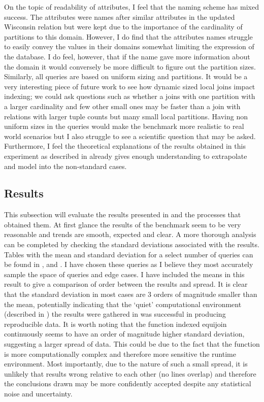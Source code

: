 On the topic of readability of attributes, I feel that the naming scheme has
mixed success. The attributes were names after similar attributes in the updated
Wisconsin relation but were kept due to the importance of the cardinality of
partitions to this domain. However, I do find that the attributes names struggle
to easily convey the values in their domains somewhat limiting the expression of
the database. I do feel, however, that if the name gave more information about
the domain it would conversely be more difficult to figure out the partition
sizes. Similarly, all queries are based on uniform sizing and partitions. It
would be a very interesting piece of future work to see how dynamic sized local
joins impact indexing; we could ask questions such as whether a joins with one
partition with a larger cardinality and few other small ones may be faster than
a join with relations with larger tuple counts but many small local partitions.
Having non uniform sizes in the queries would make the benchmark more realistic
to real world scenarios but I also struggle to see a scientific question that
may be asked. Furthermore, I feel the theoretical explanations of the results
obtained in this experiment as described in 
already gives enough understanding to extrapolate and model into the
non-standard cases.

\subsection{Results}
This subsection will evaluate the results presented in
 and the processes that obtained them.
At first glance the results of the benchmark seem to be very reasonable and
trends are smooth, expected and clear. A more thorough analysis can be completed
by checking the standard deviations associated with the results. Tables with the
mean and standard deviation for a select number of queries can be found in
,
 and
. I have
chosen these queries as I believe they most accurately sample the space of
queries and edge cases. I have included the means in this result to give a
comparison of order between the results and spread. It is clear that the
standard deviation in most cases are 3 orders of magnitude smaller than the
mean, potentially indicating that the `quiet' computational environment
(described in ) the
results were gathered in was successful in producing reproducible data. It is
worth noting that the function indexed equijoin continuously seems to have an
order of magnitude higher standard deviation, suggesting a larger spread of
data. This could be due to the fact that the function is more computationally
complex and therefore more sensitive the runtime environment. Most importantly,
due to the nature of such a small spread, it is unlikely that results wrong
relative to each other (no lines overlap) and therefore the conclusions drawn
may be more confidently accepted despite any statistical noise and uncertainty.


